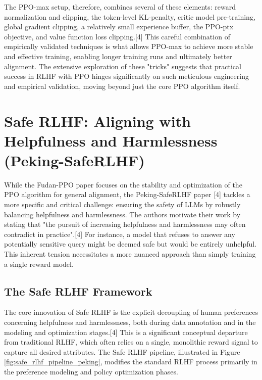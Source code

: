 \documentclass[10pt,journal,compsoc]{IEEEtran} %
\begin{document}
The PPO-max setup, therefore, combines several of these elements: reward normalization and clipping, the token-level KL-penalty, critic model pre-training, global gradient clipping, a relatively small experience buffer, the PPO-ptx objective, and value function loss clipping.[4] This careful combination of empirically validated techniques is what allows PPO-max to achieve more stable and effective training, enabling longer training runs and ultimately better alignment. The extensive exploration of these "tricks" suggests that practical success in RLHF with PPO hinges significantly on such meticulous engineering and empirical validation, moving beyond just the core PPO algorithm itself.

\section{Safe RLHF: Aligning with Helpfulness and Harmlessness (Peking-SafeRLHF)}
\label{sec:peking_safe_rlhf}

While the Fudan-PPO paper focuses on the stability and optimization of the PPO algorithm for general alignment, the Peking-SafeRLHF paper [4] tackles a more specific and critical challenge: ensuring the safety of LLMs by robustly balancing helpfulness and harmlessness. The authors motivate their work by stating that "the pursuit of increasing helpfulness and harmlessness may often contradict in practice".[4] For instance, a model that refuses to answer any potentially sensitive query might be deemed safe but would be entirely unhelpful. This inherent tension necessitates a more nuanced approach than simply training a single reward model.

\subsection{The Safe RLHF Framework}
The core innovation of Safe RLHF is the explicit decoupling of human preferences concerning helpfulness and harmlessness, both during data annotation and in the modeling and optimization stages.[4] This is a significant conceptual departure from traditional RLHF, which often relies on a single, monolithic reward signal to capture all desired attributes. The Safe RLHF pipeline, illustrated in Figure \ref{fig:safe_rlhf_pipeline_peking}, modifies the standard RLHF process primarily in the preference modeling and policy optimization phases.

\end{document}
